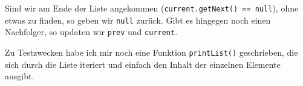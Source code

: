 \documentclass{article}
\begin{document}
	Sind wir am Ende der Liste angekommen (\texttt{current.getNext() == null}), ohne etwas zu finden, so geben wir \texttt{null} zurück. Gibt es hingegen noch einen Nachfolger, so updaten wir \texttt{prev} und \texttt{current}.
	
	Zu Testzwecken habe ich mir noch eine Funktion \texttt{printList()} geschrieben, die sich durch die Liste iteriert und einfach den Inhalt der einzelnen Elemente ausgibt.
	
	
\end{document}
